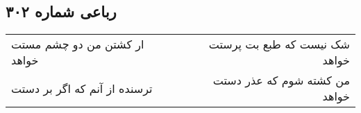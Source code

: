 \begin{center}
\section*{رباعی شماره ۳۰۲}
\label{sec:sh302}
\begin{longtable}{l p{0.5cm} r}
ار کشتن من دو چشم مستت خواهد
&&
شک نیست که طبع بت پرستت خواهد
\\
ترسنده از آنم که اگر بر دستت
&&
من کشته شوم که عذر دستت خواهد
\\
\end{longtable}
\end{center}

